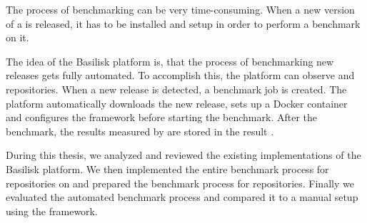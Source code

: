 The process of benchmarking \tsp{} can be very time-consuming.
When a new version of a \ts{} is released, it has to be installed and setup in order to perform a benchmark on it.

The idea of the Basilisk platform is, that the process of benchmarking new \ts{} releases gets fully automated.
To accomplish this, the platform can observe \dockh{} and \gh{} repositories.
When a new release is detected, a benchmark job is created.
The platform automatically downloads the new release, sets up a Docker container and configures the \iguana{} framework before starting the benchmark.
After the benchmark, the results measured by \iguana{} are stored in the result \ts{}.

During this thesis, we analyzed and reviewed the existing implementations of the Basilisk platform.
We then implemented the entire benchmark process for repositories on \dockh{} and prepared the benchmark process for \gh{} repositories.
Finally we evaluated the automated benchmark process and compared it to a manual setup using the \iguana{} framework.

